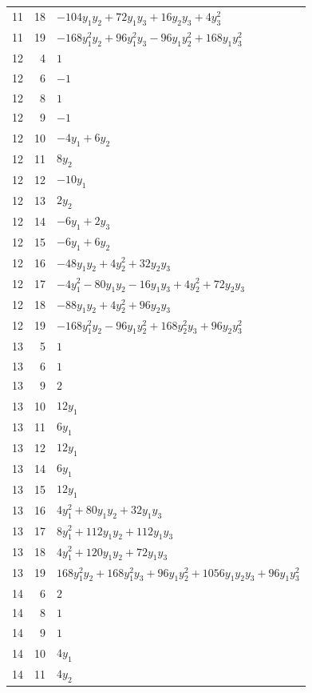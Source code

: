 \documentclass[10pt,a4paper]{article}
\begin{document}
{\begin{longtable}{rrp{125mm}}
11 & 18 & $- 104 y_{1} y_{2} + 72 y_{1} y_{3} + 16 y_{2} y_{3} + 4 y_{3}^{2}$\\
11 & 19 & $- 168 y_{1}^{2} y_{2} + 96 y_{1}^{2} y_{3} - 96 y_{1} y_{2}^{2} + 168 y_{1} y_{3}^{2}$\\
12 & 4 & $1$\\
12 & 6 & $-1$\\
12 & 8 & $1$\\
12 & 9 & $-1$\\
12 & 10 & $- 4 y_{1} + 6 y_{2}$\\
12 & 11 & $8 y_{2}$\\
12 & 12 & $- 10 y_{1}$\\
12 & 13 & $2 y_{2}$\\
12 & 14 & $- 6 y_{1} + 2 y_{3}$\\
12 & 15 & $- 6 y_{1} + 6 y_{2}$\\
12 & 16 & $- 48 y_{1} y_{2} + 4 y_{2}^{2} + 32 y_{2} y_{3}$\\
12 & 17 & $- 4 y_{1}^{2} - 80 y_{1} y_{2} - 16 y_{1} y_{3} + 4 y_{2}^{2} + 72 y_{2} y_{3}$\\
12 & 18 & $- 88 y_{1} y_{2} + 4 y_{2}^{2} + 96 y_{2} y_{3}$\\
12 & 19 & $- 168 y_{1}^{2} y_{2} - 96 y_{1} y_{2}^{2} + 168 y_{2}^{2} y_{3} + 96 y_{2} y_{3}^{2}$\\
13 & 5 & $1$\\
13 & 6 & $1$\\
13 & 9 & $2$\\
13 & 10 & $12 y_{1}$\\
13 & 11 & $6 y_{1}$\\
13 & 12 & $12 y_{1}$\\
13 & 14 & $6 y_{1}$\\
13 & 15 & $12 y_{1}$\\
13 & 16 & $4 y_{1}^{2} + 80 y_{1} y_{2} + 32 y_{1} y_{3}$\\
13 & 17 & $8 y_{1}^{2} + 112 y_{1} y_{2} + 112 y_{1} y_{3}$\\
13 & 18 & $4 y_{1}^{2} + 120 y_{1} y_{2} + 72 y_{1} y_{3}$\\
13 & 19 & $168 y_{1}^{2} y_{2} + 168 y_{1}^{2} y_{3} + 96 y_{1} y_{2}^{2} + 1056 y_{1} y_{2} y_{3} + 96 y_{1} y_{3}^{2}$\\
14 & 6 & $2$\\
14 & 8 & $1$\\
14 & 9 & $1$\\
14 & 10 & $4 y_{1}$\\
14 & 11 & $4 y_{2}$\\

\end{longtable}}
\end{document}
